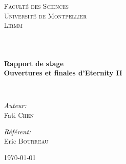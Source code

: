 

\begin{titlepage}
	\begin{center}
	
	
	\textsc{\LARGE Faculté des Sciences\\
		Université de Montpellier\\
		Lirmm\\} \ \\[1.5cm]
	
	\textsc{\Large }\\[0.5cm]
	
	\HRule \\[0.4cm]
	
	{\huge \bfseries Rapport de stage\\
	Ouvertures et finales d'Eternity II\\[0.4cm] }
	
	\HRule \\[1.5cm]
	
	\begin{minipage}{0.4\textwidth}
		\begin{flushleft} \large
			\emph{Auteur:}\\
				Fati \textsc{Chen}\\
		\end{flushleft}
	\end{minipage}
	\begin{minipage}{0.4\textwidth}
		\begin{flushright} \large
			\emph{Référent:} \\
				Eric \textsc{Bourreau}
		\end{flushright}
	\end{minipage}
	
	\vfill
	\thispagestyle{empty}

	{\large \today}
	\end{center}
\end{titlepage}


